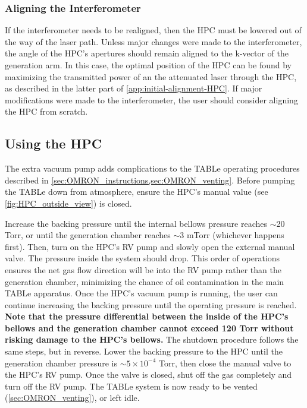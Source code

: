 \subsubsection{Aligning the Interferometer}
If the interferometer needs to be realigned, then the HPC must be lowered out of the way of the laser path. Unless major changes were made to the interferometer, the angle of the HPC's apertures should remain aligned to the k-vector of the generation arm. In this case, the optimal position of the HPC can be found by maximizing the transmitted power of an the attenuated laser through the HPC, as described in the latter part of \cref{app:initial-alignment-HPC}. If major modifications were made to the interferometer, the user should consider aligning the HPC from scratch.


\subsection{Using the HPC}

The extra vacuum pump adds complications to the TABLe operating procedures described in \cref{sec:OMRON_instructions,sec:OMRON_venting}. Before pumping the TABLe down from atmosphere, ensure the HPC's manual value (see \cref{fig:HPC_outside_view}) is closed.

Increase the backing pressure until the internal bellows pressure reaches $\sim$20 Torr, or until the generation chamber reaches $\sim$3 mTorr (whichever happens first). Then, turn on the HPC's RV pump and slowly open the external manual valve. The pressure inside the system should drop. This order of operations ensures the net gas flow direction will be into the RV pump rather than the generation chamber, minimizing the chance of oil contamination in the main TABLe apparatus. Once the HPC's vacuum pump is running, the user can continue increasing the backing pressure until the operating pressure is reached. \textbf{Note that the pressure differential between the inside of the HPC's bellows and the generation chamber cannot exceed 120 Torr without risking damage to the HPC's bellows.} The shutdown procedure follows the same steps, but in reverse. Lower the backing pressure to the HPC until the generation chamber pressure is $\sim 5 \times 10^{-4}$ Torr, then close the manual valve to the HPC's RV pump. Once the valve is closed, shut off the gas completely and turn off the RV pump. The TABLe system is now ready to be vented (\cref{sec:OMRON_venting}), or left idle.


